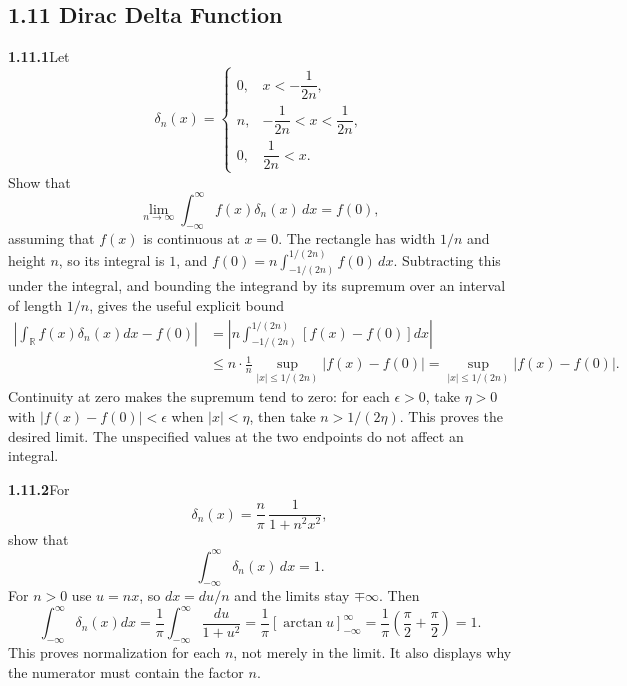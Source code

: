 \subsection*{1.11 Dirac Delta Function}

\par\bigskip
\noindent\textbf{1.11.1}\quad Let
\[
\delta_{n}(x)=\begin{cases}
0, & x<-\dfrac{1}{2n},\\[6pt]
n, & -\dfrac{1}{2n}<x<\dfrac{1}{2n},\\[6pt]
0, & \dfrac{1}{2n}<x.
\end{cases}
\]
Show that
\[
\lim_{n\to\infty}\int_{-\infty}^{\infty}f(x)\delta_{n}(x)\,dx=f(0),
\]
assuming that $f(x)$ is  continuous at $x=0$.
\solution
{}
The rectangle has width $1/n$ and height $n$, so its integral is $1$,
and $f(0)=n\int_{-1/(2n)}^{1/(2n)}f(0)\,dx$.
Subtracting this under the integral, and bounding the integrand by its
supremum over an interval of length $1/n$, gives the useful explicit
bound
\[
 \begin{aligned}
 \left|\int_{\mathbb R}f(x)\delta_n(x)dx-f(0)\right|
 &=\left|n\int_{-1/(2n)}^{1/(2n)}[f(x)-f(0)]dx\right|\\
 &\le n\cdot\frac1n\sup_{|x|\le1/(2n)}|f(x)-f(0)|
 =\sup_{|x|\le1/(2n)}|f(x)-f(0)|.
 \end{aligned}
\]
Continuity at zero makes the supremum tend to zero: for each
$\epsilon>0$, take $\eta>0$ with $|f(x)-f(0)|<\epsilon$ when
$|x|<\eta$, then take $n>1/(2\eta)$. This proves the desired limit.
The unspecified values at the two endpoints do not affect an integral.


\par\bigskip
\noindent\textbf{1.11.2}\quad For
\[
\delta_{n}(x)=\frac{n}{\pi}\,\frac{1}{1+n^{2}x^{2}},
\]
show that
\[
\int_{-\infty}^{\infty}\delta_{n}(x)\,dx=1.
\]
\solution
For $n>0$ use $u=nx$, so $dx=du/n$ and the limits stay
$\mp\infty$. Then
\[
 \int_{-\infty}^\infty\delta_n(x)dx
 =\frac1\pi\int_{-\infty}^\infty\frac{du}{1+u^2}
 =\frac1\pi[\arctan u]_{-\infty}^\infty
 =\frac1\pi\left(\frac\pi2+\frac\pi2\right)=1.
\]
This proves normalization for each $n$, not merely in the limit.
It also displays why the numerator must contain the factor $n$.


